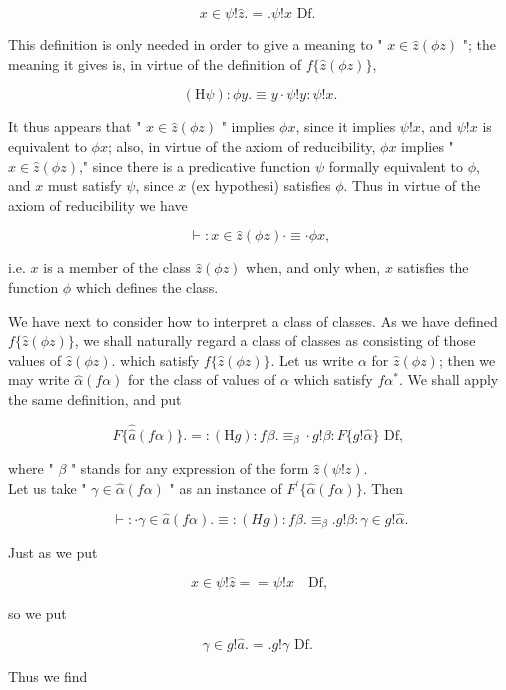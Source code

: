 \documentclass[10pt]{article}
\begin{document}
$$
x \in \psi!\hat{z} .=. \psi!x \text { Df. }
$$

This definition is only needed in order to give a meaning to " $x \in \hat{z}(\phi z)$ "; the meaning it gives is, in virtue of the definition of $f\{\hat{z}(\phi z)\}$,

$$
(\mathrm{H} \psi): \phi y . \equiv y \cdot \psi!y: \psi!x .
$$

It thus appears that " $x \in \hat{z}(\phi z)$ " implies $\phi x$, since it implies $\psi!x$, and $\psi!x$ is equivalent to $\phi x$; also, in virtue of the axiom of reducibility, $\phi x$ implies " $x \in \hat{z}(\phi z)$," since there is a predicative function $\psi$ formally equivalent to $\phi$,\\
and $x$ must satisfy $\psi$, since $x$ (ex hypothesi) satisfies $\phi$. Thus in virtue of the axiom of reducibility we have

$$
\vdash: x \in \hat{z}(\phi z) \cdot \equiv \cdot \phi x,
$$

i.e. $x$ is a member of the class $\hat{z}(\phi z)$ when, and only when, $x$ satisfies the function $\phi$ which defines the class.

We have next to consider how to interpret a class of classes. As we have defined $f\{\hat{z}(\phi z)\}$, we shall naturally regard a class of classes as consisting of those values of $\hat{z}(\phi z)$. which satisfy $f\{\hat{z}(\phi z)\}$. Let us write $\alpha$ for $\hat{z}(\phi z)$; then we may write $\hat{\alpha}(f \alpha)$ for the class of values of $\alpha$ which satisfy $f \alpha^{*}$. We shall apply the same definition, and put

$$
F\{\hat{\hat{a}}(f \alpha)\} .=:(\mathrm{H} g): f \beta . \equiv_{\beta} \cdot g!\beta: F\{g!\hat{\alpha}\} \text { Df, }
$$

where " $\beta$ " stands for any expression of the form $\hat{z}(\psi!z)$.\\
Let us take " $\gamma \in \hat{\alpha}(f \alpha)$ " as an instance of $F^{\prime}\{\hat{\alpha}(f \alpha)\}$. Then

$$
\vdash: \cdot \gamma \in \hat{a}(f \alpha) . \equiv:(H g): f \beta . \equiv_{\beta} . g!\beta: \gamma \in g!\hat{\alpha} .
$$

Just as we put

$$
x \in \psi!\hat{z}==\psi!x \quad \mathrm{Df},
$$

so we put

$$
\gamma \in g!\hat{a} .=. g!\gamma \text { Df. }
$$

Thus we find
\end{document}
